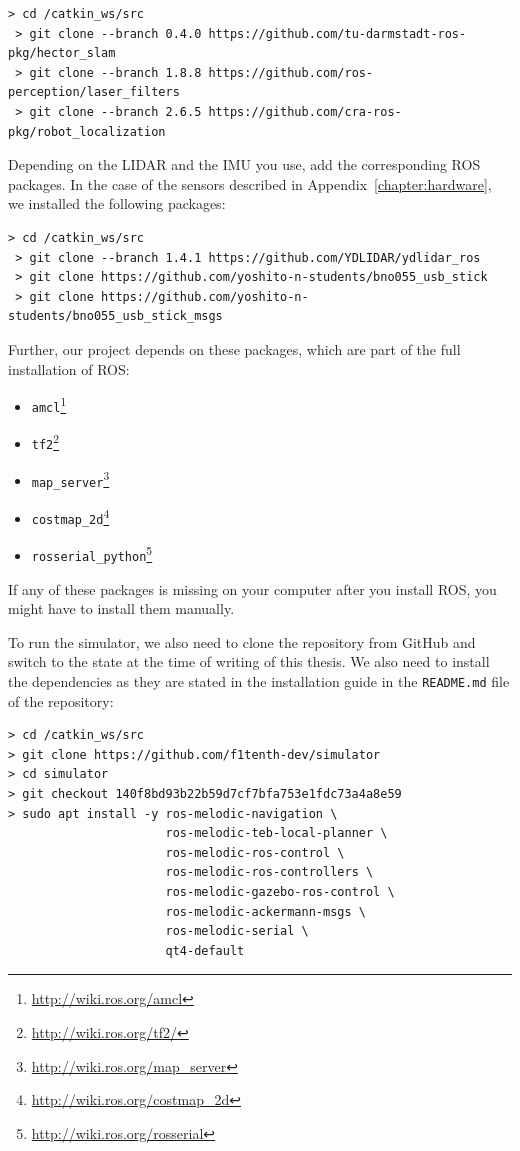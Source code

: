 \begin{Verbatim}[fontsize=\small]
 > cd /catkin_ws/src
 > git clone --branch 0.4.0 https://github.com/tu-darmstadt-ros-pkg/hector_slam
 > git clone --branch 1.8.8 https://github.com/ros-perception/laser_filters
 > git clone --branch 2.6.5 https://github.com/cra-ros-pkg/robot_localization
\end{Verbatim}

Depending on the \gls*{LIDAR} and the \gls*{IMU} you use, add the corresponding ROS packages. In the case of the sensors described in Appendix~\ref{chapter:hardware}, we installed the following packages:

\begin{Verbatim}[fontsize=\small]
 > cd /catkin_ws/src
 > git clone --branch 1.4.1 https://github.com/YDLIDAR/ydlidar_ros
 > git clone https://github.com/yoshito-n-students/bno055_usb_stick
 > git clone https://github.com/yoshito-n-students/bno055_usb_stick_msgs
\end{Verbatim}

Further, our project depends on these packages, which are part of the full installation of ROS:

\begin{itemize}
	\item \texttt{amcl}\footnote{\url{http://wiki.ros.org/amcl}}
	\item \texttt{tf2}\footnote{\url{http://wiki.ros.org/tf2/}}
	\item \texttt{map\_server}\footnote{\url{http://wiki.ros.org/map_server}}
	\item \texttt{costmap\_2d}\footnote{\url{http://wiki.ros.org/costmap_2d}}
	\item \texttt{rosserial\_python}\footnote{\url{http://wiki.ros.org/rosserial}}
\end{itemize}

If any of these packages is missing on your computer after you install ROS, you might have to install them manually.

To run the simulator, we also need to clone the repository from GitHub and switch to the state at the time of writing of this thesis. We also need to install the dependencies as they are stated in the installation guide in the \texttt{README.md} file of the repository:

\begin{Verbatim}[fontsize=\small]
> cd /catkin_ws/src
> git clone https://github.com/f1tenth-dev/simulator
> cd simulator
> git checkout 140f8bd93b22b59d7cf7bfa753e1fdc73a4a8e59
> sudo apt install -y ros-melodic-navigation \
                      ros-melodic-teb-local-planner \
                      ros-melodic-ros-control \
                      ros-melodic-ros-controllers \
                      ros-melodic-gazebo-ros-control \
                      ros-melodic-ackermann-msgs \
                      ros-melodic-serial \
                      qt4-default
\end{Verbatim}

